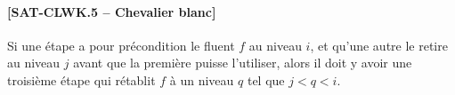{\paragraph*{[SAT-CLWK.5 -- Chevalier blanc]} Si une étape a pour précondition le fluent $f$
  au niveau $i$, et qu'une autre le retire au niveau $j$ avant que la première
  puisse l'utiliser, alors il doit y avoir une troisième étape qui rétablit $f$
  à un niveau $q$ tel que $j < q < i$.

} %
